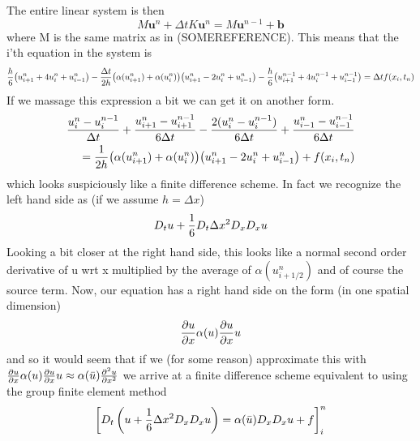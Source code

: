 \documentclass[a4paper,english, 10pt, twoside]{article}
\renewcommand{\d}{\partial}
\begin{document}
The entire linear system is then
$$
M\mathbf{u}^n +\Delta tK\mathbf{u}^n = M\mathbf{u}^{n-1} +\mathbf{b}
$$
where M is the same matrix as in (SOMEREFERENCE). This means that the i'th equation in the system is
\begin{align*}
 {h\over6}\big(u^{n}_{i+1}+4u^{n}_{i} +u^{n}_{i-1}\big) -{\Delta t\over 2h}\big(\alpha(u^{n}_{i+1})+\alpha(u^{n}_{i})\big)\big(u^{n}_{i+1}
 -2u^{n}_{i} +u^{n}_{i-1}\big) -{h\over6}\big(u^{n-1}_{i+1}+4u^{n-1}_{i}+u^{n-1}_{i-1}\big) = \Delta tf(x_i,t_n)
\end{align*}
If we massage this expression a bit we can get it on another form.
\begin{align*}
 {u^{n}_{i}-u^{n-1}_{i}\over \Delta t} +{u^{n}_{i+1}-u^{n-1}_{i+1}\over 6\Delta t} -{2(u^{n}_{i}-u^{n-1}_{i})\over 6\Delta t} +
 {u^{n}_{i-1}-u^{n-1}_{i-1}\over6\Delta t} \\
 = {1\over 2h}\big(\alpha(u^{n}_{i+1})+\alpha(u^{n}_{i})\big)\big(u^{n}_{i+1}-2u^{n}_{i} +u^{n}_{i-1}\big) +f(x_i,t_n)
\end{align*}
which looks suspiciously like a finite difference scheme. In fact we recognize the left hand side as (if we assume $h = \Delta x$)
\begin{align*}
 D_tu +{1\over6}D_t\Delta x^2D_xD_xu
\end{align*}
Looking a bit closer at the right hand side, this looks like a normal second order derivative of u wrt x multiplied by the average of 
$\alpha(u^n_{i+1/2})$ and of course the source term. Now, our equation has a right hand side on the form (in one spatial dimension)
\begin{equation*}
 {\d u\over\d x}\alpha(u){\d u\over\d x}u
\end{equation*}
and so it would seem that if we (for some reason) approximate this with $ {\d u\over\d x}\alpha(u){\d u\over\d x}u \approx \alpha(\bar{u}) 
{\d^2 u\over \d x^2}$ we arrive at a finite difference scheme equivalent to using the group finite element method
\begin{align*}
 \left[D_t\left(u +{1\over6}\Delta x^2D_xD_xu\right)= \alpha(\bar{u})D_xD_xu +f\right]^n_i
 \end{align*}
\end{document}
